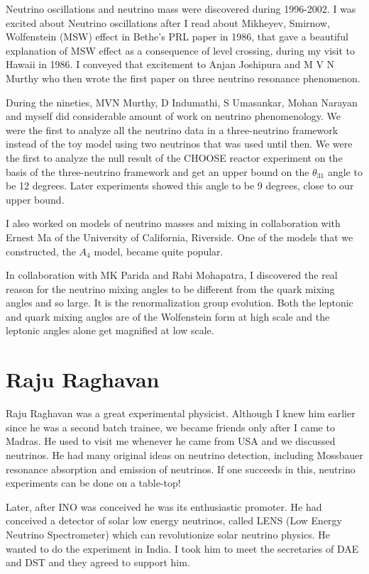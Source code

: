 Neutrino oscillations and neutrino mass were discovered during 
1996-2002. I was excited about Neutrino oscillations after I read about 
Mikheyev, Smirnow, Wolfenstein (MSW) effect in Bethe's PRL paper in 1986, 
that gave a beautiful explanation of MSW effe\-ct as a consequence of 
level crossing, during my visit to Hawaii in 1986. I conveyed that 
excitement to Anjan Joshipura and M V N Murthy who then wrote the first 
paper on three neutrino resonance phenomenon.

During the nineties,  MVN Murthy, D Indumathi, S Umasan\-kar, 
Mohan Narayan and myself did considerable amount of work on neutrino 
phenomenology. We were the first to analyze all the neutrino data in a 
three-neutrino framework instead of the toy model using two neutrinos 
that was used until then. We were the first to analyze the null result 
of the CHOOSE reactor experi\-ment on the basis of the three-neutrino 
framework and get an upper bound on the $\theta_{31}$ angle to be 12 degrees. 
Later experiments showed this angle to be 9 degrees, close to our upper 
bound.

I also worked on models of neutrino masses and mixing in collaboration 
with Ernest Ma of the University of California, Ri\-verside. One of the 
models that we constructed, the $A_4$ model, became quite popular.

In collaboration with MK Parida and Rabi Mohapatra, I discovered the 
real reason for the neutrino mixing angles to be diffe\-rent from the 
quark mixing angles and so large. It is the renormalization group 
evolution. Both the leptonic and quark mixing angles are of the 
Wolfenstein form at high scale and the leptonic angles alone get 
magnified at low scale.
\vspace{-\topsep}
\section*{Raju Raghavan}

Raju Raghavan was a great experimental physicist. Although I knew him 
earlier since he was a second batch trainee, we became friends only 
after I came to Madras. He used to visit me whenever he came from USA 
and we discussed neutrinos. He had many origi\-nal ideas on neutrino 
detection, including Mossbauer resonance absorption and emission of 
neutrinos. If one succeeds in this, neutrino experiments can be done on 
a table-top!
 
Later, after INO was conceived he was its enthusiastic promo\-ter. He had 
conceived a detector of solar low energy neutrinos, called LENS (Low 
Energy Neutrino Spectrometer) which can revo\-lutionize solar neutrino 
physics. He wanted to do the expe\-riment in India. I took him to meet the 
secretaries of DAE and DST and they agreed to support him.

